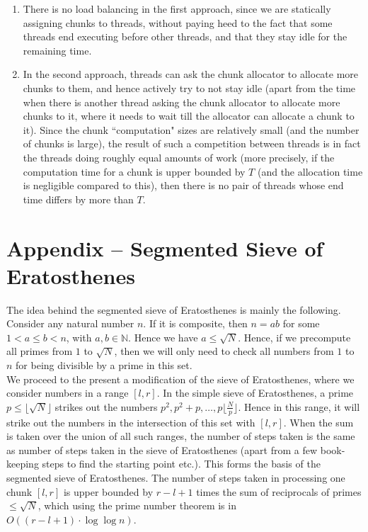 \documentclass[a4paper]{article}
\newcommand{\nl}{\vspace{0.2cm}\\}
\newcommand{\mb}{\mathbb}
\begin{document}
\begin{enumerate}
    \item There is no load balancing in the first approach, since we are statically assigning chunks to threads, without paying
        heed to the fact that some threads end executing before other threads, and that they stay idle for the remaining time.
    \item In the second approach, threads can ask the chunk allocator to allocate more chunks to them, and hence actively try to not stay idle (apart from the time when there is another thread
        asking the chunk allocator to allocate more chunks to it, where it needs to wait till the allocator can allocate a chunk to it). Since the chunk ``computation" sizes are relatively small (and
        the number of chunks is large), the result of such a competition between threads is in fact the threads doing roughly equal amounts of work (more precisely, if the computation time for a
        chunk is upper bounded by $T$ (and the allocation time is negligible compared to this), then there is no pair of threads whose end time differs by more than $T$.
\end{enumerate}

\section{Appendix -- Segmented Sieve of Eratosthenes}

The idea behind the segmented sieve of Eratosthenes is mainly the following.\nl
Consider any natural number $n$. If it is composite, then $n = ab$ for some $1 < a \le b < n$, with $a, b \in \mb{N}$. Hence we have $a \le \sqrt{N}$. Hence, if we precompute all primes from $1$ to
$\sqrt{N}$, then we will only need to check all numbers from $1$ to $n$ for being divisible by a prime in this set.\nl
We proceed to the present a modification of the sieve of Eratosthenes, where we consider numbers in a range $[l, r]$. In the simple sieve of Eratosthenes, a prime $p \le
\lfloor\sqrt{N}\rfloor$ strikes out the numbers $p^2, p^2 + p, \ldots, p\lfloor\frac{N}{p}\rfloor$. Hence in this range, it will strike out the numbers in the intersection of this set with $[l, r]$. When the sum is taken over the union of
all such ranges, the number of steps taken is the same as number of steps taken in the sieve of Eratosthenes (apart from a few book-keeping steps to find the starting point etc.). This forms the
basis of the segmented sieve of Eratosthenes. The number of steps taken in processing one chunk $[l, r]$ is upper bounded by $r - l + 1$ times the sum of reciprocals of primes $\le \sqrt{N}$, which
using the prime number theorem is in $O((r - l + 1) \cdot \log \log n)$.
\end{document}
